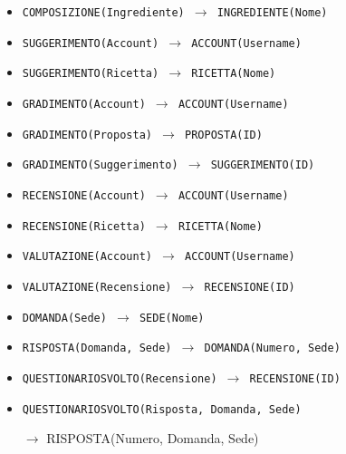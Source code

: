 \begin{itemize}[parsep=0pt,listparindent=9\parindent]
    \item\tt COMPOSIZIONE(Ingrediente) $\rightarrow$ INGREDIENTE(Nome)
    \item\tt SUGGERIMENTO(Account) $\rightarrow$ ACCOUNT(Username)
    \item\tt SUGGERIMENTO(Ricetta) $\rightarrow$ RICETTA(Nome)
    \item\tt GRADIMENTO(Account) $\rightarrow$ ACCOUNT(Username)
    \item\tt GRADIMENTO(Proposta) $\rightarrow$ PROPOSTA(ID)
    \item\tt GRADIMENTO(Suggerimento) $\rightarrow$ SUGGERIMENTO(ID)
    \item\tt RECENSIONE(Account) $\rightarrow$ ACCOUNT(Username)
    \item\tt RECENSIONE(Ricetta) $\rightarrow$ RICETTA(Nome)
    \item\tt VALUTAZIONE(Account) $\rightarrow$ ACCOUNT(Username)
    \item\tt VALUTAZIONE(Recensione) $\rightarrow$ RECENSIONE(ID)
    \item\tt DOMANDA(Sede) $\rightarrow$ SEDE(Nome)
    \item\tt RISPOSTA(Domanda, Sede) $\rightarrow$ DOMANDA(Numero, Sede)
    \item\tt QUESTIONARIOSVOLTO(Recensione) $\rightarrow$ RECENSIONE(ID)
    \item\tt QUESTIONARIOSVOLTO(Risposta, Domanda, Sede)
    
        $\rightarrow$ RISPOSTA(Numero, Domanda, Sede)
\end{itemize}
